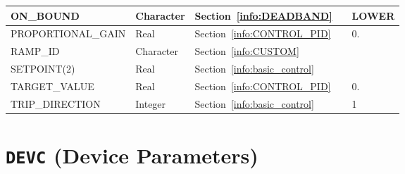 \documentclass[11pt]{book}
\begin{document}
\begin{longtable}{@{\extracolsep{\fill}}|l|l|l|l|l|}
{\ct ON\_BOUND}          & Character   & Section~\ref{info:DEADBAND}             &    & {\ct LOWER}            \\ \hline
{\ct PROPORTIONAL\_GAIN} & Real        & Section~\ref{info:CONTROL_PID}          &    &  0.                    \\ \hline
{\ct RAMP\_ID}           & Character   & Section~\ref{info:CUSTOM}               &    &                        \\ \hline
{\ct SETPOINT(2)}        & Real        & Section~\ref{info:basic_control}        &    &                        \\ \hline
{\ct TARGET\_VALUE}      & Real        & Section~\ref{info:CONTROL_PID}          &    &  0.                    \\ \hline
{\ct TRIP\_DIRECTION}    & Integer     & Section~\ref{info:basic_control}        &    &   1                    \\ \hline
\end{longtable}


\vspace{\baselineskip}


\section{\texorpdfstring{{\tt DEVC}}{DEVC} (Device Parameters)}
\end{document}

